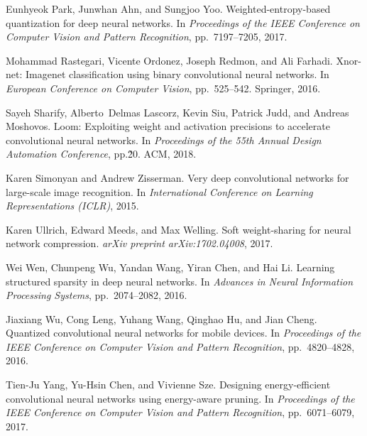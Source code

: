 \documentclass{article} %
\begin{document}
\begin{thebibliography}{36}
Eunhyeok Park, Junwhan Ahn, and Sungjoo Yoo.
\newblock Weighted-entropy-based quantization for deep neural networks.
\newblock In \emph{Proceedings of the IEEE Conference on Computer Vision and
  Pattern Recognition}, pp.\ 7197--7205, 2017.

Mohammad Rastegari, Vicente Ordonez, Joseph Redmon, and Ali Farhadi.
\newblock Xnor-net: Imagenet classification using binary convolutional neural
  networks.
\newblock In \emph{European Conference on Computer Vision}, pp.\ 525--542.
  Springer, 2016.

Sayeh Sharify, Alberto~Delmas Lascorz, Kevin Siu, Patrick Judd, and Andreas
  Moshovos.
\newblock Loom: Exploiting weight and activation precisions to accelerate
  convolutional neural networks.
\newblock In \emph{Proceedings of the 55th Annual Design Automation
  Conference}, pp.\~20. ACM, 2018.

Karen Simonyan and Andrew Zisserman.
\newblock Very deep convolutional networks for large-scale image recognition.
\newblock In \emph{International Conference on Learning Representations
  (ICLR)}, 2015.

Karen Ullrich, Edward Meeds, and Max Welling.
\newblock Soft weight-sharing for neural network compression.
\newblock \emph{arXiv preprint arXiv:1702.04008}, 2017.

Wei Wen, Chunpeng Wu, Yandan Wang, Yiran Chen, and Hai Li.
\newblock Learning structured sparsity in deep neural networks.
\newblock In \emph{Advances in Neural Information Processing Systems}, pp.\  2074--2082, 2016.

Jiaxiang Wu, Cong Leng, Yuhang Wang, Qinghao Hu, and Jian Cheng.
\newblock Quantized convolutional neural networks for mobile devices.
\newblock In \emph{Proceedings of the IEEE Conference on Computer Vision and
  Pattern Recognition}, pp.\ 4820--4828, 2016.

Tien-Ju Yang, Yu-Hsin Chen, and Vivienne Sze.
\newblock Designing energy-efficient convolutional neural networks using
  energy-aware pruning.
\newblock In \emph{Proceedings of the IEEE Conference on Computer Vision and
  Pattern Recognition}, pp.\ 6071--6079, 2017.


\end{thebibliography}
\end{document}
